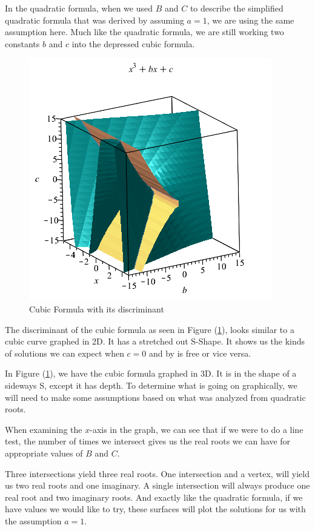 \documentclass[14pt]{extarticle}
\begin{document}
In the quadratic formula, when we used $B$ and $C$ to describe the simplified quadratic formula that was derived by assuming $a=1$, we are using the same assumption here. Much like the quadratic formula, we are still working two constants $b$ and $c$ into the depressed cubic formula.
\begin{figure}
	\begin{center}
		\includegraphics[scale=0.60]{graph9.png}
		\caption{\small Cubic Formula with its discriminant}
		\label{fig:img7}
	\end{center}
\end{figure}
\indent The discriminant of the cubic formula as seen in Figure (\ref{fig:img7}), looks similar to a cubic curve graphed in 2D. It has a stretched out S-Shape. It shows us the kinds of solutions we can expect when $c=0$ and by is free or vice versa.

\indent In Figure (\ref{fig:img7}), we have the cubic formula graphed in 3D. It is in the shape of a sideways S, except it has depth. To determine what is going on graphically, we will need to make some assumptions based on what was analyzed from quadratic roots.

\indent When examining the $x$-axis in the graph, we can see that if we were to do a line test, the number of times we intersect gives us the real roots we can have for appropriate values of $B$ and $C$.

Three intersections yield three real roots. One intersection and a vertex, will yield us two real roots and one imaginary. A single intersection will always produce one real root and two imaginary roots. And exactly like the quadratic formula, if we have values we would like to try, these surfaces will plot the solutions for us with the assumption $a=1$.
\end{document}
